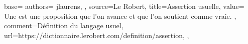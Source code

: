 {
  base={
    authors={
      jlaurens,
    },
    source=Le Robert,
    title=Assertion usuelle,
    value={
      Une  est une proposition que l'on avance et que l'on soutient comme vraie.
    },
    comment={Définition du langage usuel},
    url={https://dictionnaire.lerobert.com/definition/assertion},
  },
}
